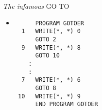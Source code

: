 \begin{frame}[fragile]{\textit{The infamous} GO TO}  
 \begin{itemize}[<+(0)->]
  \item [] 
   \begin{verbatim}
      PROGRAM GOTOER
  1   WRITE(*, *) 0
      GOTO 2
  9   WRITE(*, *) 8
      GOTO 10
    :
    :
  7   WRITE(*, *) 6
      GOTO 8
 10   WRITE(*, *) 9
      END PROGRAM GOTOER
   \end{verbatim}
 \end{itemize}
\end{frame}